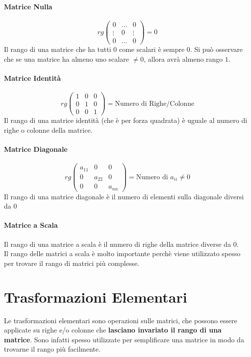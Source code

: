 \paragraph{Matrice Nulla}
\[ rg
	\begin{pmatrix}
		0      & ... & 0      \\
		\vdots & 0   & \vdots \\
		0      & ... & 0
	\end{pmatrix}
	= 0
\]
Il rango di una matrice che ha tutti $0$ come scalari è sempre $0$.
Si può osservare che se una matrice ha almeno uno scalare $\neq 0$, allora avrà almeno rango $1$.

\paragraph{Matrice Identità}
\[ rg
	\begin{pmatrix}
		1 & 0 & 0 \\
		0 & 1 & 0 \\
		0 & 0 & 1
	\end{pmatrix}
	= \text{Numero di Righe/Colonne}
\]
Il rango di una matrice identità (che è per forza quadrata) è uguale al numero di righe o colonne della matrice.

\paragraph{Matrice Diagonale}
\[ rg
	\begin{pmatrix}
		a_{11} & 0      & 0      \\
		0      & a_{22} & 0      \\
		0      & 0      & a_{nn}
	\end{pmatrix}
	= \text{Numero di } a_{ii}\neq 0
\]
Il rango di una matrice diagonale è il numero di elementi sulla diagonale diversi da 0

\paragraph{Matrice a Scala}
Il rango di una matrice a scala è il numero di righe della matrice diverse da 0.
\\Il rango delle matrici a scala è molto importante perchè viene utilizzato spesso per trovare il rango di matrici più complesse.

\section{Trasformazioni Elementari}
Le trasformazioni elementari sono operazioni sulle matrici, che possono essere applicate su righe e/o colonne che \textbf{lasciano invariato il rango di una matrice}.
Sono infatti spesso utilizzate per semplificare una matrice in modo da trovarne il rango più facilmente.

